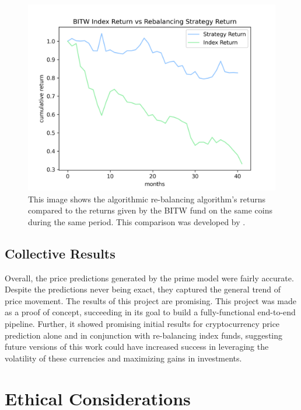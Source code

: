 \documentclass[10pt,twocolumn]{article}
\begin{document}
\begin{figure}
    \centering
    \includegraphics[scale=0.50]{images/index_return_vs_rebalancing_strategy.png}
    \caption{
        This image shows the algorithmic re-balancing algorithm's returns compared to the returns given by the BITW fund on the same coins during the same period. This comparison was developed by \textcite{algorithmictrading}.
    }
    \label{re-balancing-algorithm-results}
\end{figure}

\subsection{Collective Results}

Overall, the price predictions generated by the prime model were fairly accurate. Despite the predictions never being exact, they captured the general trend of price movement. The results of this project are promising. This project was made as a proof of concept, succeeding in its goal to build a fully-functional end-to-end pipeline. Further, it showed promising initial results for cryptocurrency price prediction alone and in conjunction with re-balancing index funds, suggesting future versions of this work could have increased success in leveraging the volatility of these currencies and maximizing gains in investments.

\section{Ethical Considerations} \label{ethicalconsiderations}
\end{document}
